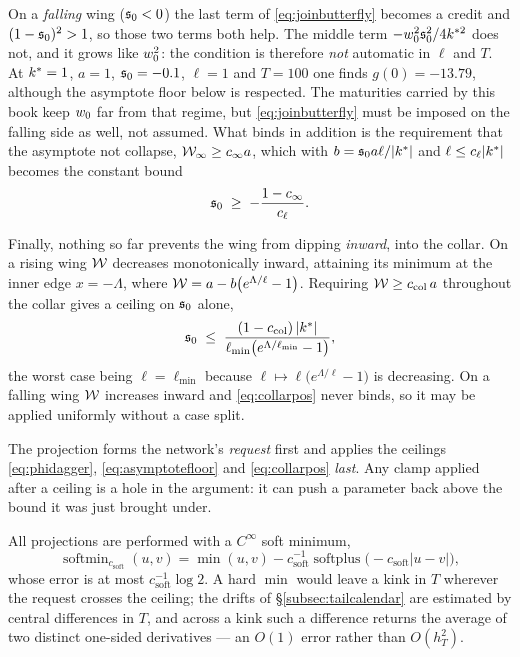 On a \emph{falling} wing ($\mathfrak{s}_{0}<0$) the last term of \eqref{eq:joinbutterfly} becomes a credit
and $(1-\mathfrak{s}_{0})^{2}>1$, so those two terms both help. The middle term
$-w_{0}^{2}\mathfrak{s}_{0}^{2}/4k^{*2}$ does not, and it grows like $w_{0}^{2}$: the condition
is therefore \emph{not} automatic in $\ell$ and $T$. At $k^{*}=1$, $a=1$, $\mathfrak{s}_{0}=-0.1$,
$\ell=1$ and $T=100$ one finds $g(0)=-13.79$, although the asymptote floor below is respected. The
maturities carried by this book keep $w_{0}$ far from that regime, but
\eqref{eq:joinbutterfly} must be imposed on the falling side as well, not assumed. What binds in
addition is the
requirement that the asymptote not collapse, $\mathcal{W}_{\infty}\ge c_{\infty}a$, which with
$b=\mathfrak{s}_{0}a\ell/|k^{*}|$ and $\ell\le c_{\ell}|k^{*}|$ becomes the constant bound
\begin{equation}\label{eq:asymptotefloor}
  \mathfrak{s}_{0}\;\ge\;-\frac{1-c_{\infty}}{c_{\ell}} .
\end{equation}

Finally, nothing so far prevents the wing from dipping \emph{inward}, into the collar. On a rising
wing $\mathcal{W}$ decreases monotonically inward, attaining its minimum at the inner edge
$x=-\Lambda$, where $\mathcal{W}=a-b\bigl(e^{\Lambda/\ell}-1\bigr)$. Requiring
$\mathcal{W}\ge c_{\mathrm{col}}\,a$ throughout the collar gives a ceiling on $\mathfrak{s}_{0}$ alone,
\begin{equation}
  \mathfrak{s}_{0}\;\le\;\frac{(1-c_{\mathrm{col}})\,|k^{*}|}
                        {\ell_{\min}\bigl(e^{\Lambda/\ell_{\min}}-1\bigr)},
  \label{eq:collarpos}
\end{equation}
the worst case being $\ell=\ell_{\min}$ because $\ell\mapsto\ell\bigl(e^{\Lambda/\ell}-1\bigr)$ is
decreasing. On a falling wing $\mathcal{W}$ increases inward and \eqref{eq:collarpos} never binds, so it may be
applied uniformly without a case split.

\begin{remark}
The projection forms the network's \emph{request} first and applies the ceilings
\eqref{eq:phidagger}, \eqref{eq:asymptotefloor} and \eqref{eq:collarpos} \emph{last}. Any clamp
applied after a ceiling is a hole in the argument: it can push a parameter back above the bound it
was just brought under.
\end{remark}

\begin{remark}\label{rem:softmin}
All projections are performed with a $C^{\infty}$ soft minimum,
\[
  \operatorname{softmin}_{c_{\mathrm{soft}}}(u,v)=\min(u,v)-c_{\mathrm{soft}}^{-1}\operatorname{softplus}\bigl(-c_{\mathrm{soft}}|u-v|\bigr),
\]
whose error is at most $c_{\mathrm{soft}}^{-1}\log 2$. A hard $\min$ would leave a kink in $T$
wherever the request crosses the ceiling; the drifts of \S\ref{subsec:tailcalendar} are estimated by
central differences in $T$, and across a kink such a difference returns the average of two distinct
one-sided derivatives --- an $O(1)$ error rather than $O(h_{T}^{2})$. 
\end{remark}

